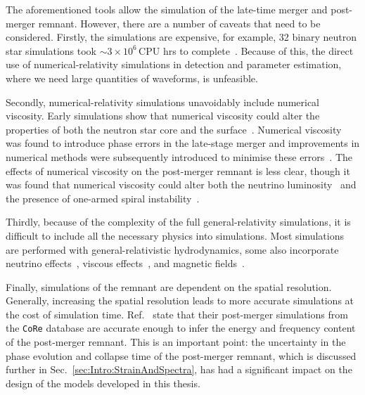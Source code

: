 \documentclass[../Thesis.tex]{subfiles}
\begin{document}
    
    The aforementioned tools allow the simulation of the late-time merger and post-merger remnant.
    However, there are a number of caveats that need to be considered.
    Firstly, the simulations are expensive, for example, 32 binary neutron star simulations took  $\sim 3\times 10^6\,$CPU hrs to complete~\cite{Takami2015}.
    Because of this, the direct use of numerical-relativity simulations in detection and parameter estimation, where we need large quantities of waveforms, is unfeasible. \par
    Secondly, numerical-relativity simulations unavoidably include numerical viscosity.
    Early simulations show that numerical viscosity could alter the properties of both the neutron star core and the surface~\cite{Shibata2000bar,Cerda-Duran2010}.
    Numerical viscosity was found to introduce phase errors in the late-stage merger and improvements in numerical methods were subsequently introduced to minimise these errors~\cite{Radice2014}.
    The effects of numerical viscosity on the post-merger remnant is less clear, though it was found that numerical viscosity could alter both the neutrino luminosity~\cite{Sekiguchi2016} and the presence of one-armed spiral instability~\cite{Radice2016}.\par

    Thirdly, because of the complexity of the full general-relativity simulations, it is difficult to include all the necessary physics into simulations.
    Most simulations are performed with general-relativistic hydrodynamics, some also incorporate neutrino effects~\cite[e.g.,][]{Sekiguchi2011,Perego2014,Foucart2016,Radice2016a,Zappa2018}, viscous effects~\cite[e.g.,][]{Shapiro2000,Duez2004, Radice2017,Shibata2017}, and magnetic fields~\cite[e.g.,][]{Duez2006,Duez2006a,Siegel2013,Siegel2014,Giacomazzo2011,Kiuchia2012,Giacomazzo2013,Kiuchi2014,Giacomazzo2015}. \par

    Finally, simulations of the remnant are dependent on the spatial resolution.
    Generally, increasing the spatial resolution leads to more accurate simulations at the cost of simulation time.
    Ref.~\cite{Dietrich2018} state that their post-merger simulations from  the \texttt{CoRe} database are accurate enough to infer the energy and frequency content of the post-merger remnant.
    This is an important point: the uncertainty in the phase evolution  and collapse time of the post-merger remnant, which is discussed further in Sec.~\ref{sec:Intro:StrainAndSpectra}, has had a significant impact on the design of the models developed in this thesis.
\end{document}
